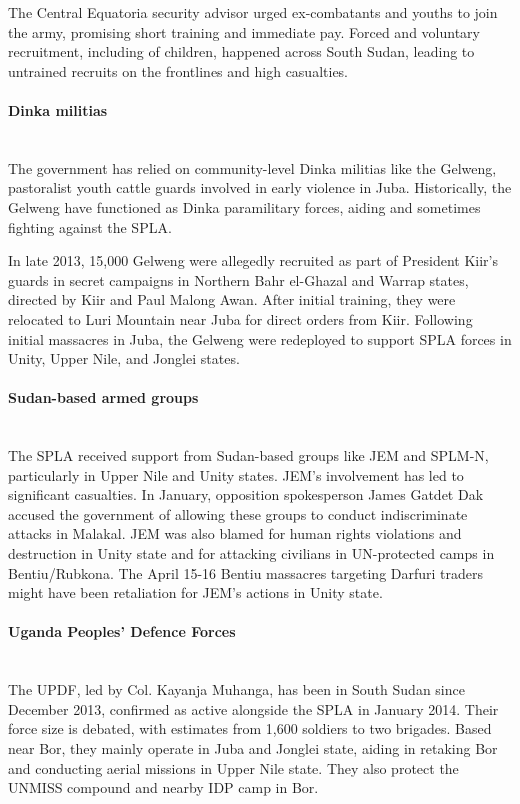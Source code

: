 \documentclass[14pt,a4paper]{article}
\begin{document}
The Central Equatoria security advisor urged ex-combatants and youths to join the army, promising short training and immediate pay. Forced and voluntary recruitment, including of children, happened across South Sudan, leading to untrained recruits on the frontlines and high casualties.

\paragraph{Dinka militias} \mbox{}\\
The government has relied on community-level Dinka militias like the Gelweng, pastoralist youth cattle guards involved in early violence in Juba. Historically, the Gelweng have functioned as Dinka paramilitary forces, aiding and sometimes fighting against the SPLA.

In late 2013, 15,000 Gelweng were allegedly recruited as part of President Kiir's guards in secret campaigns in Northern Bahr el-Ghazal and Warrap states, directed by Kiir and Paul Malong Awan. After initial training, they were relocated to Luri Mountain near Juba for direct orders from Kiir. Following initial massacres in Juba, the Gelweng were redeployed to support SPLA forces in Unity, Upper Nile, and Jonglei states.

\paragraph{Sudan-based armed groups} \mbox{}\\
The SPLA received support from Sudan-based groups like JEM and SPLM-N, particularly in Upper Nile and Unity states. JEM's involvement has led to significant casualties. In January, opposition spokesperson James Gatdet Dak accused the government of allowing these groups to conduct indiscriminate attacks in Malakal. JEM was also blamed for human rights violations and destruction in Unity state and for attacking civilians in UN-protected camps in Bentiu/Rubkona. The April 15-16 Bentiu massacres targeting Darfuri traders might have been retaliation for JEM's actions in Unity state.

\paragraph{Uganda Peoples' Defence Forces} \mbox{}\\
The UPDF, led by Col. Kayanja Muhanga, has been in South Sudan since December 2013, confirmed as active alongside the SPLA in January 2014. Their force size is debated, with estimates from 1,600 soldiers to two brigades. Based near Bor, they mainly operate in Juba and Jonglei state, aiding in retaking Bor and conducting aerial missions in Upper Nile state. They also protect the UNMISS compound and nearby IDP camp in Bor.
\end{document}
